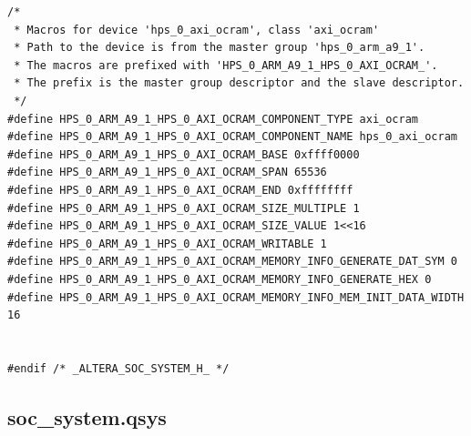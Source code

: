 \documentclass[conference]{IEEEtran}
\begin{document}
\begin{lstlisting}
/*
 * Macros for device 'hps_0_axi_ocram', class 'axi_ocram'
 * Path to the device is from the master group 'hps_0_arm_a9_1'.
 * The macros are prefixed with 'HPS_0_ARM_A9_1_HPS_0_AXI_OCRAM_'.
 * The prefix is the master group descriptor and the slave descriptor.
 */
#define HPS_0_ARM_A9_1_HPS_0_AXI_OCRAM_COMPONENT_TYPE axi_ocram
#define HPS_0_ARM_A9_1_HPS_0_AXI_OCRAM_COMPONENT_NAME hps_0_axi_ocram
#define HPS_0_ARM_A9_1_HPS_0_AXI_OCRAM_BASE 0xffff0000
#define HPS_0_ARM_A9_1_HPS_0_AXI_OCRAM_SPAN 65536
#define HPS_0_ARM_A9_1_HPS_0_AXI_OCRAM_END 0xffffffff
#define HPS_0_ARM_A9_1_HPS_0_AXI_OCRAM_SIZE_MULTIPLE 1
#define HPS_0_ARM_A9_1_HPS_0_AXI_OCRAM_SIZE_VALUE 1<<16
#define HPS_0_ARM_A9_1_HPS_0_AXI_OCRAM_WRITABLE 1
#define HPS_0_ARM_A9_1_HPS_0_AXI_OCRAM_MEMORY_INFO_GENERATE_DAT_SYM 0
#define HPS_0_ARM_A9_1_HPS_0_AXI_OCRAM_MEMORY_INFO_GENERATE_HEX 0
#define HPS_0_ARM_A9_1_HPS_0_AXI_OCRAM_MEMORY_INFO_MEM_INIT_DATA_WIDTH 16


#endif /* _ALTERA_SOC_SYSTEM_H_ */

\end{lstlisting}

\subsection{soc\_system.qsys}
\end{document}
